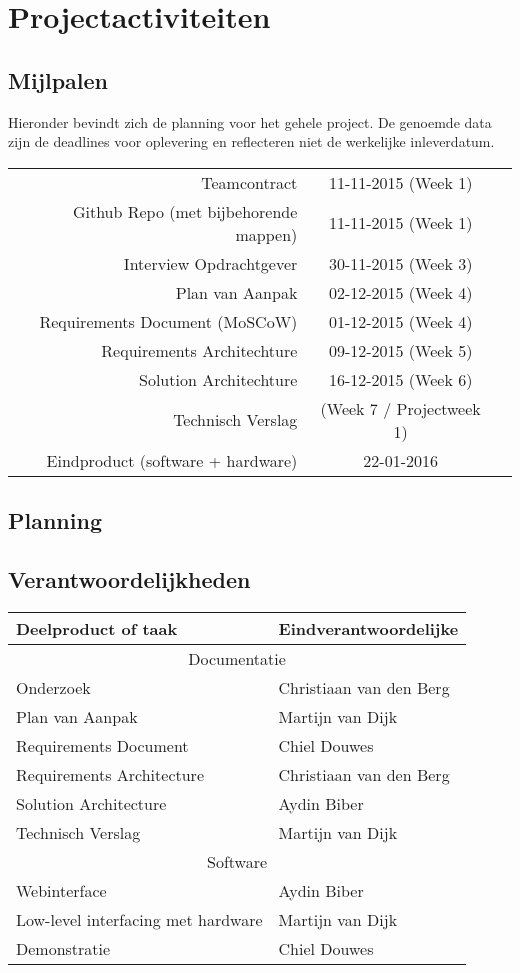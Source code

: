\chapter{Projectactiviteiten}
\section{Mijlpalen}
Hieronder bevindt zich de planning voor het gehele project. De genoemde data zijn de deadlines voor oplevering en reflecteren niet de werkelijke inleverdatum.

\begin{tabular}{ r | c r }
  Teamcontract & 11-11-2015 (Week 1) \\
  Github Repo (met bijbehorende mappen) & 11-11-2015 (Week 1) \\
  Interview Opdrachtgever & 30-11-2015 (Week 3) \\
  Plan van Aanpak & 02-12-2015 (Week 4) \\
  Requirements Document (MoSCoW) & 01-12-2015 (Week 4) \\
  Requirements Architechture &  09-12-2015 (Week 5) \\
  Solution Architechture & 16-12-2015 (Week 6) \\
  Technisch Verslag	& (Week 7 / Projectweek 1) \\
  Eindproduct (software + hardware)	& 22-01-2016 \\
\end{tabular}

\section{Planning}


\section{Verantwoordelijkheden}
\begin{tabular}{ p{5cm} | l }
\textbf{Deelproduct of taak} & \textbf{Eindverantwoordelijke}\\
\hline
\multicolumn{2}{c}{Documentatie}\\
\hline
Onderzoek & Christiaan van den Berg \\
Plan van Aanpak & Martijn van Dijk \\
Requirements Document & Chiel Douwes \\
Requirements Architecture & Christiaan van den Berg \\
Solution Architecture & Aydin Biber \\
Technisch Verslag & Martijn van Dijk \\
\hline
\multicolumn{2}{c}{Software}\\
\hline
Webinterface & Aydin Biber\\
Low-level interfacing met hardware & Martijn van Dijk\\
Demonstratie & Chiel Douwes \\
\end{tabular}
